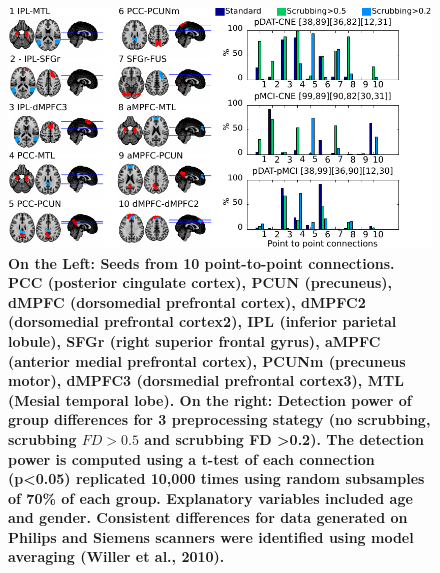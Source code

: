 \documentclass[authoryear,preprint,review]{elsarticle}
\begin{document}
\begin{figure}[!ht]
\begin{center}
\includegraphics[width=\linewidth]{../figures/p2pdetection.pdf}
\end{center}
\caption{
{\bf On the Left: Seeds from 10 point-to-point connections. PCC (posterior cingulate cortex), PCUN (precuneus), dMPFC (dorsomedial prefrontal cortex), dMPFC2 (dorsomedial prefrontal cortex2), IPL (inferior parietal lobule), SFGr (right superior frontal gyrus), aMPFC (anterior medial prefrontal cortex), PCUNm (precuneus motor), dMPFC3 (dorsmedial prefrontal cortex3), MTL (Mesial temporal lobe). On the right: Detection power of group differences for 3 preprocessing stategy (no scrubbing, scrubbing $FD>0.5$ and scrubbing FD >0.2). The detection power is computed using a t-test of each connection (p<0.05) replicated 10,000 times using random subsamples of 70\% of each group. Explanatory variables included age and gender. Consistent differences for data generated on Philips and Siemens scanners were identified using model averaging (Willer et al., 2010).}
}
\label{fig_p2p}
\end{figure}



\clearpage
\appendix
\end{document}
